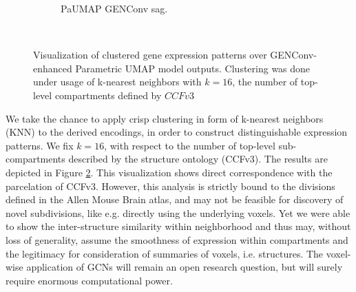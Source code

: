 \documentclass[]{article}
\begin{document}
\begin{figure}
\begin{subfigure}{.28\textwidth}
		\caption{PaUMAP GENConv sag.}
		\label{fig:disc_clustering_sag}
	\end{subfigure}\\
	
	\caption[Visualization of clustered gene expression patterns over GENConv-enhanced Parametric UMAP model outputs]{Visualization of clustered gene expression patterns over GENConv-enhanced Parametric UMAP model outputs. Clustering was done under usage of k-nearest neighbors with $k=16$, the number of top-level compartments defined by $CCFv3$}
	\label{fig:disc_clustering}
\end{figure}


We take the chance to apply crisp clustering in form of k-nearest neighbors (KNN) to the derived encodings, in order to construct distinguishable expression patterns. We fix $k=16$, with respect to the number of top-level sub-compartments described by the structure ontology (CCFv3). The results are depicted in Figure \ref{fig:disc_clustering}. This visualization shows direct correspondence with the parcelation of CCFv3. However, this analysis is strictly bound to the divisions defined in the Allen Mouse Brain atlas, and may not be feasible for discovery of novel subdivisions, like e.g. \citet{takata_flexible_2021} directly using the underlying voxels. Yet we were able to show the inter-structure similarity within neighborhood and thus may, without loss of generality, assume the smoothness of expression within compartments and the legitimacy for consideration of summaries of voxels, i.e. structures. The voxel-wise application of GCNs will remain an open research question, but will surely require enormous computational power.\\



%
%
%	
\end{document}
